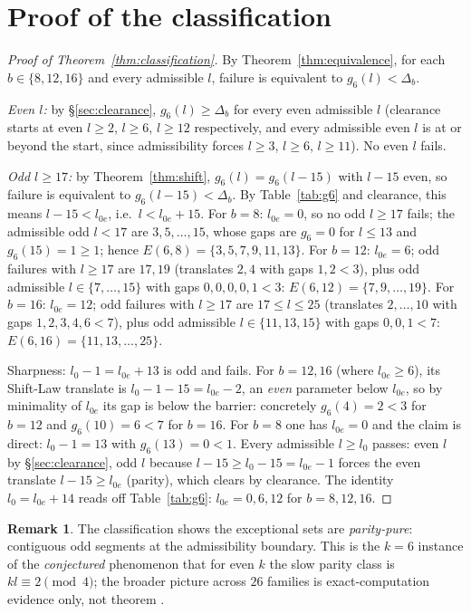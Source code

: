 \documentclass[11pt,reqno]{article}
\theoremstyle{definition}
\newtheorem{remark}[theorem]{Remark}
\begin{document}
\section{Proof of the classification}\label{sec:classification}
\begin{proof}[Proof of Theorem~\ref{thm:classification}]
By Theorem~\ref{thm:equivalence}, for each $b\in\{8,12,16\}$ and every admissible $l$, failure is equivalent to $g_6(l)<\Delta_b$.

\emph{Even $l$:} by \S\ref{sec:clearance}, $g_6(l)\ge\Delta_b$ for every even admissible $l$ (clearance starts at even $l\ge2$, $l\ge6$, $l\ge12$ respectively, and every admissible even $l$ is at or beyond the start, since admissibility forces $l\ge3$, $l\ge6$, $l\ge11$). No even $l$ fails.

\emph{Odd $l\ge17$:} by Theorem~\ref{thm:shift}, $g_6(l)=g_6(l-15)$ with $l-15$ even, so failure is equivalent to $g_6(l-15)<\Delta_b$. By Table~\ref{tab:g6} and clearance, this means $l-15<l_{0e}$, i.e.\ $l<l_{0e}+15$.
For $b=8$: $l_{0e}=0$, so no odd $l\ge17$ fails; the admissible odd $l<17$ are $3,5,\dots,15$, whose gaps are $g_6=0$ for $l\le13$ and $g_6(15)=1\ge1$; hence $E(6,8)=\{3,5,7,9,11,13\}$.
For $b=12$: $l_{0e}=6$; odd failures with $l\ge17$ are $17,19$ (translates $2,4$ with gaps $1,2<3$), plus odd admissible $l\in\{7,\dots,15\}$ with gaps $0,0,0,0,1<3$: $E(6,12)=\{7,9,\dots,19\}$.
For $b=16$: $l_{0e}=12$; odd failures with $l\ge17$ are $17\le l\le 25$ (translates $2,\dots,10$ with gaps $1,2,3,4,6<7$), plus odd admissible $l\in\{11,13,15\}$ with gaps $0,0,1<7$: $E(6,16)=\{11,13,\dots,25\}$.

Sharpness: $l_0-1=l_{0e}+13$ is odd and fails. For $b=12,16$ (where $l_{0e}\ge6$), its Shift-Law translate is $l_0-1-15=l_{0e}-2$, an \emph{even} parameter below $l_{0e}$, so by minimality of $l_{0e}$ its gap is below the barrier: concretely $g_6(4)=2<3$ for $b=12$ and $g_6(10)=6<7$ for $b=16$. For $b=8$ one has $l_{0e}=0$ and the claim is direct: $l_0-1=13$ with $g_6(13)=0<1$. Every admissible $l\ge l_0$ passes: even $l$ by \S\ref{sec:clearance}, odd $l$ because $l-15\ge l_0-15=l_{0e}-1$ forces the even translate $l-15\ge l_{0e}$ (parity), which clears by clearance. The identity $l_0=l_{0e}+14$ reads off Table~\ref{tab:g6}: $l_{0e}=0,6,12$ for $b=8,12,16$.
\end{proof}

\begin{remark}
The classification shows the exceptional sets are \emph{parity-pure}: contiguous odd segments at the admissibility boundary. This is the $k=6$ instance of the \emph{conjectured} phenomenon that for even $k$ the slow parity class is $kl\equiv2\pmod4$; the broader picture across $26$ families is exact-computation evidence only, not theorem \cite{M08}.
\end{remark}
\end{document}
